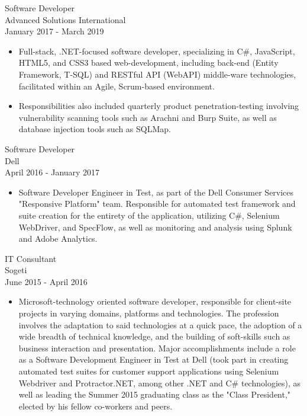 \documentclass[11pt]{res} %
\begin{document}
\begin{resume}
Software Developer \\
Advanced Solutions International \\
January 2017 - March 2019
\vspace{0.2in}
   \begin{itemize} \itemsep -2pt  %
   \item Full-stack, .NET-focused software developer, specializing in C\#, JavaScript, HTML5, and CSS3 based web-development, including back-end (Entity Framework, T-SQL) and RESTful API (WebAPI) middle-ware technologies, facilitated within an Agile, Scrum-based environment.
\newline
    \item Responsibilities also included quarterly product penetration-testing involving vulnerability scanning tools such as Arachni and Burp Suite, as well as database injection tools such as SQLMap.
 \end{itemize}

 Software Developer \\
Dell \\
April 2016 - January 2017
\vspace{0.2in}
   \begin{itemize} \itemsep -2pt  %
   \item Software Developer Engineer in Test, as part of the Dell Consumer Services "Responsive Platform" team. Responsible for automated test framework and suite creation for the entirety of the application, utilizing C\#, Selenium WebDriver, and SpecFlow, as well as monitoring and analysis using Splunk and Adobe Analytics.
 \end{itemize}
 
 
IT Consultant \\
Sogeti \\
June 2015 - April 2016
\vspace{0.2in}
   \begin{itemize} \itemsep -2pt  %
   \item Microsoft-technology oriented software developer, responsible for client-site projects in varying domains, platforms and technologies. The profession involves the adaptation to said technologies at a quick pace, the adoption of a wide breadth of technical knowledge, and the building of soft-skills such as business interaction and presentation. Major accomplishments include a role as a Software Development Engineer in Test at Dell (took part in creating automated test suites for customer support applications using Selenium Webdriver and Protractor.NET, among other .NET and C\# technologies), as well as leading the Summer 2015 graduating class as the "Class President," elected by his fellow co-workers and peers.
 \end{itemize}


\end{resume}
\end{document}
